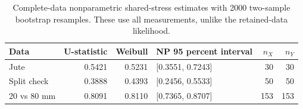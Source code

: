 \begin{table}[htbp]
\centering
\caption{Complete-data nonparametric shared-stress estimates with 2000 two-sample bootstrap resamples. These use all measurements, unlike the retained-data likelihood.}\label{tab:nonparametric}
\small
\begin{tabular}{lrrlrr}
\toprule
Data & U-statistic & Weibull & NP 95 percent interval & $n_X$ & $n_Y$ \\
\midrule
Jute & 0.5421 & 0.5231 & [0.3551, 0.7243] & 30 & 30 \\
Split check & 0.3888 & 0.4393 & [0.2456, 0.5533] & 50 & 50 \\
20 vs 80 mm & 0.8091 & 0.8110 & [0.7365, 0.8707] & 153 & 153 \\
\bottomrule
\end{tabular}
\end{table}
